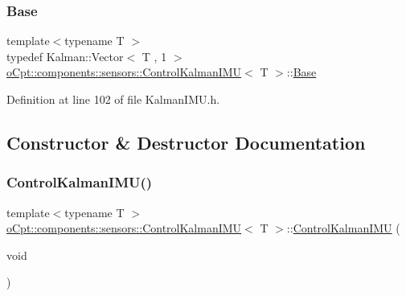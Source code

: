 \subsubsection{\texorpdfstring{Base}{Base}}
{\footnotesize\ttfamily template$<$typename T $>$ \\
typedef Kalman\+::\+Vector$<$ T , 1 $>$ \hyperlink{classo_cpt_1_1components_1_1sensors_1_1_control_kalman_i_m_u}{o\+Cpt\+::components\+::sensors\+::\+Control\+Kalman\+I\+MU}$<$ T $>$\+::\hyperlink{classo_cpt_1_1components_1_1sensors_1_1_control_kalman_i_m_u_a86f04b59796a0780208ff528543bf390}{Base}}



Definition at line 102 of file Kalman\+I\+M\+U.\+h.



\subsection{Constructor \& Destructor Documentation}
\hypertarget{classo_cpt_1_1components_1_1sensors_1_1_control_kalman_i_m_u_a7e4619f52b9572448ad5184b6e796ee9}{}\label{classo_cpt_1_1components_1_1sensors_1_1_control_kalman_i_m_u_a7e4619f52b9572448ad5184b6e796ee9} 
\subsubsection{\texorpdfstring{Control\+Kalman\+I\+M\+U()}{ControlKalmanIMU()}\hspace{0.1cm}{\footnotesize\ttfamily [1/2]}}
{\footnotesize\ttfamily template$<$typename T $>$ \\
\hyperlink{classo_cpt_1_1components_1_1sensors_1_1_control_kalman_i_m_u}{o\+Cpt\+::components\+::sensors\+::\+Control\+Kalman\+I\+MU}$<$ T $>$\+::\hyperlink{classo_cpt_1_1components_1_1sensors_1_1_control_kalman_i_m_u}{Control\+Kalman\+I\+MU} (\begin{DoxyParamCaption}\item[{void}]{ }\end{DoxyParamCaption})\hspace{0.3cm}{\ttfamily [inline]}}



